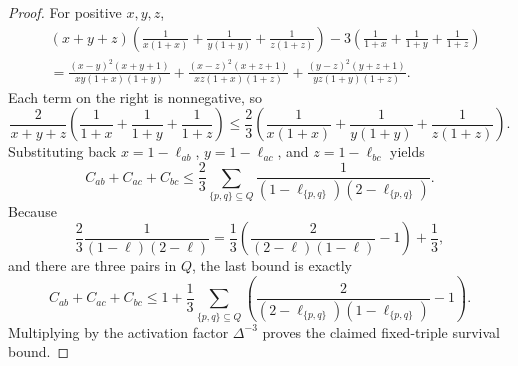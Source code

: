 \begin{proof}
For positive $x,y,z$,
\[
\begin{aligned}
&(x+y+z)\left(\frac1{x(1+x)}+\frac1{y(1+y)}
  +\frac1{z(1+z)}\right)
-3\left(\frac1{1+x}+\frac1{1+y}+\frac1{1+z}\right)\\
&=
\frac{(x-y)^2(x+y+1)}{xy(1+x)(1+y)}
+\frac{(x-z)^2(x+z+1)}{xz(1+x)(1+z)}
+\frac{(y-z)^2(y+z+1)}{yz(1+y)(1+z)} .
\end{aligned}
\]
Each term on the right is nonnegative, so
\[
\frac2{x+y+z}\left(\frac1{1+x}+\frac1{1+y}+\frac1{1+z}\right)
\le
\frac23\left(\frac1{x(1+x)}+\frac1{y(1+y)}+\frac1{z(1+z)}\right).
\]
Substituting back $x=1-\ell_{ab}$, $y=1-\ell_{ac}$, and
$z=1-\ell_{bc}$ yields
\[
C_{ab}+C_{ac}+C_{bc}
\le
\frac23\sum_{\{p,q\}\subseteq Q}
\frac1{(1-\ell_{\{p,q\}})(2-\ell_{\{p,q\}})}.
\]
Because
\[
\frac23\frac1{(1-\ell)(2-\ell)}
=\frac13\left(\frac{2}{(2-\ell)(1-\ell)}-1\right)+\frac13,
\]
and there are three pairs in $Q$, the last bound is exactly
\[
C_{ab}+C_{ac}+C_{bc}
\le
1+\frac13\sum_{\{p,q\}\subseteq Q}
\left(\frac{2}{(2-\ell_{\{p,q\}})(1-\ell_{\{p,q\}})}-1\right).
\]
Multiplying by the activation factor $\Delta^{-3}$ proves the claimed
fixed-triple survival bound.
\end{proof}
